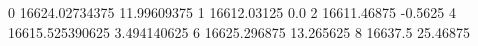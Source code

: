 0 16624.02734375 11.99609375
1 16612.03125 0.0
2 16611.46875 -0.5625
4 16615.525390625 3.494140625
6 16625.296875 13.265625
8 16637.5 25.46875
